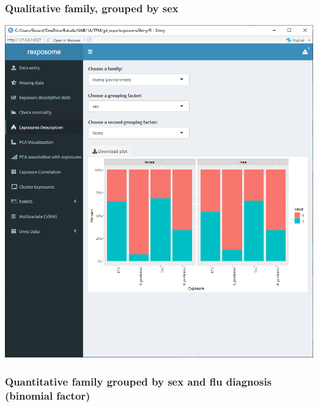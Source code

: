 \documentclass[
]{book}
\begin{document}
\hypertarget{qualitative-family-grouped-by-sex}{%
\subsubsection{Qualitative family, grouped by sex}\label{qualitative-family-grouped-by-sex}}

\includegraphics{images/analysis4_2_1.png}

\hypertarget{quantitative-family-grouped-by-sex-and-flu-diagnosis-binomial-factor}{%
\subsubsection{Quantitative family grouped by sex and flu diagnosis (binomial factor)}\label{quantitative-family-grouped-by-sex-and-flu-diagnosis-binomial-factor}}
\end{document}
